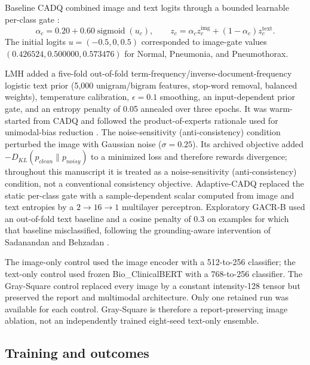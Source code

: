 \documentclass[a4paper,fleqn]{cas-sc}
\begin{document}
Baseline CADQ combined image and text logits through a bounded learnable
per-class gate \cite{arevalo2017gmu}:
\begin{equation}
\alpha_c=0.20+0.60\operatorname{sigmoid}(u_c),\qquad
z_c=\alpha_c z^{\mathrm{img}}_c+(1-\alpha_c)z^{\mathrm{text}}_c.
\end{equation}
The initial logits $u=(-0.5,0,0.5)$ corresponded to image-gate values
$(0.426524,0.500000,0.573476)$ for Normal, Pneumonia, and Pneumothorax.

LMH added a five-fold out-of-fold term-frequency/inverse-document-frequency
logistic text prior (5,000 unigram/bigram features, stop-word removal, balanced
weights), temperature calibration, $\epsilon=0.1$ smoothing, an input-dependent
prior gate, and an entropy penalty of 0.05 annealed over three epochs. It was
warm-started from CADQ and followed the product-of-experts rationale used for
unimodal-bias reduction \cite{cadene2019rubi}. The noise-sensitivity
(anti-consistency) condition perturbed the
image with Gaussian noise ($\sigma=0.25$). Its archived objective added
$-D_{KL}(p_{clean}\|p_{noisy})$ to a minimized loss and therefore rewards
divergence; throughout this manuscript it is treated as a noise-sensitivity
(anti-consistency) condition, not a conventional consistency objective.
Adaptive-CADQ replaced the static per-class gate with a sample-dependent scalar
computed from image and text entropies by a $2\rightarrow16\rightarrow1$
multilayer perceptron. Exploratory GACR-B used an out-of-fold text baseline and
a cosine penalty of 0.3 on examples for which that baseline misclassified, following
the grounding-aware intervention of Sadanandan and Behzadan
\cite{sadanandan2026consistentdangerous}.

The image-only control used the image encoder with a 512-to-256 classifier; the
text-only control used frozen Bio\_ClinicalBERT with a 768-to-256 classifier.
The Gray-Square control replaced every image by a constant intensity-128 tensor
but preserved the report and multimodal architecture. Only one retained run was
available for each control. Gray-Square is therefore a report-preserving image
ablation, not an independently trained eight-seed text-only ensemble.

\subsection{Training and outcomes}\label{sec:training}
\end{document}
